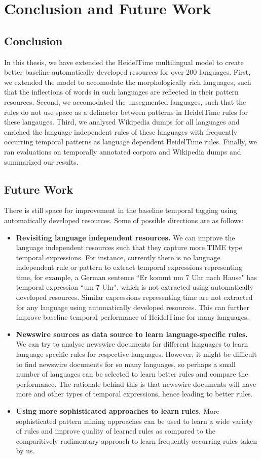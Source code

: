 \chapter{Conclusion and Future Work} \label{the-chapter-6}

\section{Conclusion}
In this thesis, we have extended the HeidelTime multilingual model to create better baseline automatically developed resources for over 200 languages. First, we extended the model to accomodate the morphologically rich languages, such that the inflections of words in such languages are reflected in their pattern resources. Second, we accomodated the unsegmented languages, such that the rules do not use space as a delimeter between patterns in HeidelTime rules for these langauges. Third, we analysed Wikipedia dumps for all languages and enriched the language independent rules of these languages with frequently occurring temporal patterns as language dependent HeidelTime rules. Finally, we ran evaluations on temporally annotated corpora and Wikipedia dumps and summarized our results. 

\section{Future Work}
There is still space for improvement in the baseline temporal tagging using automatically developed resources. Some of possible directions are as follows:

\begin{itemize}
	\item \textbf{Revisiting language independent resources.} We can improve the language independent resources such that they capture more TIME type temporal expressions. For instance, currently there is no language independent rule or pattern to extract temporal expressions representing time, for example, a German sentence ``Er kommt um 7 Uhr nach Hause" has temporal expression ``um 7 Uhr", which is not extracted using automatically developed resources. Similar expressions representing time are not extracted for any language using automatically developed resources. This can further improve baseline temporal performance of HeidelTime for many languages.
	\item \textbf{Newswire sources as data source to learn language-specific rules.} We can try to analyse newswire documents for different languages to learn language specific rules for respective languages. However, it might be difficult to find newswire documents for so many languages, so perhaps a small number of languages can be selected to learn better rules and compare the performance. The rationale behind this is that newswire documents will have more and other types of temporal expressions, hence leading to better rules.
	\item \textbf{Using more sophisticated approaches to learn rules.} More sophisticated pattern mining approaches can be used to learn a wide variety of rules and improve quality of learned rules as compared to the comparitively rudimentary approach to learn frequently occurring rules taken by us. 
\end{itemize}